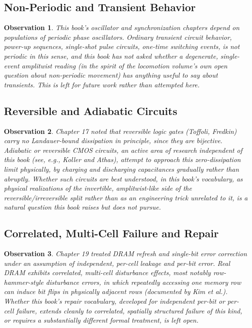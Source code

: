 \documentclass[12pt]{article}
\newtheorem{observation}{Observation}
\begin{document}
\subsection{Non-Periodic and Transient Behavior}

\begin{observation}
This book's oscillator and synchronization chapters depend on populations of periodic phase oscillators. Ordinary transient circuit behavior, power-up sequences, single-shot pulse circuits, one-time switching events, is not periodic in this sense, and this book has not asked whether a degenerate, single-event amplitwist reading (in the spirit of the locomotion volume's own open question about non-periodic movement) has anything useful to say about transients. This is left for future work rather than attempted here.
\end{observation}

\subsection{Reversible and Adiabatic Circuits}

\begin{observation}
Chapter 17 noted that reversible logic gates (Toffoli, Fredkin) carry no Landauer-bound dissipation in principle, since they are bijective. Adiabatic or reversible CMOS circuits, an active area of research independent of this book (see, e.g., Koller and Athas), attempt to approach this zero-dissipation limit physically, by charging and discharging capacitances gradually rather than abruptly. Whether such circuits are best understood, in this book's vocabulary, as physical realizations of the invertible, amplitwist-like side of the reversible/irreversible split rather than as an engineering trick unrelated to it, is a natural question this book raises but does not pursue.
\end{observation}

\subsection{Correlated, Multi-Cell Failure and Repair}

\begin{observation}
Chapter 19 treated DRAM refresh and single-bit error correction under an assumption of independent, per-cell leakage and per-bit error. Real DRAM exhibits correlated, multi-cell disturbance effects, most notably row-hammer-style disturbance errors, in which repeatedly accessing one memory row can induce bit flips in physically adjacent rows (documented by Kim et al.). Whether this book's repair vocabulary, developed for independent per-bit or per-cell failure, extends cleanly to correlated, spatially structured failure of this kind, or requires a substantially different formal treatment, is left open.
\end{observation}
\end{document}
